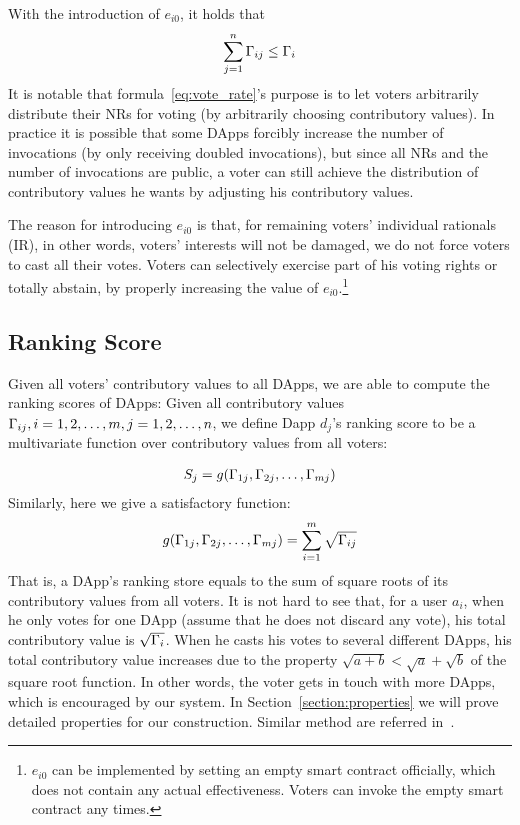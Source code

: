 With the introduction of $e_{i0}$, it holds that
$$\sum_{j=1}^n \Gamma_{ij} \leq \Gamma_i$$
\noindent It is notable that formula~\ref{eq:vote_rate}'s purpose is to let voters arbitrarily distribute their NRs for voting (by arbitrarily choosing contributory values). In practice it is possible that some DApps forcibly increase the number of invocations (by only receiving doubled invocations), but since all NRs and the number of invocations are public, a voter can still achieve the distribution of contributory values he wants by adjusting his contributory values.

The reason for introducing $e_{i0}$ is that, for remaining voters' individual rationals (IR), in other words, voters' interests will not be damaged, we do not force voters to cast all their votes. Voters can selectively exercise part of his voting rights or totally abstain, by properly increasing the value of $e_{i0}$.\footnote{$e_{i0}$ can be implemented by setting an empty smart contract officially, which does not contain any actual effectiveness. Voters can invoke the empty smart contract any times.}
\subsection{Ranking Score}
\noindent Given all voters' contributory values to all DApps, we are able to compute the
ranking scores of DApps: Given all contributory values
$\Gamma_{ij},i=1,2,\ldots,m,j=1,2,\ldots,n$, we define Dapp $d_j$'s ranking score to be a multivariate function over contributory values from all voters:

\begin{align}
	S_j = g(\Gamma_{1j},\Gamma_{2j},\ldots,\Gamma_{mj})
\end{align}
Similarly, here we give a satisfactory function:
\begin{align}
	\label{eq:sqrt}
	g(\Gamma_{1j},\Gamma_{2j},\ldots,\Gamma_{mj}) = \sum_{i=1}^m \sqrt{\Gamma_{ij}}
\end{align}
That is, a DApp's ranking store equals to the sum of square roots of its contributory values from all voters. It is not hard to see that, for a user $a_i$, when he only votes for one DApp (assume that he does not discard any vote), his total contributory value is $\sqrt{\Gamma_i}$. When he casts his votes to several different DApps, his total contributory value increases due to the property $\sqrt{a+b}<\sqrt{a}+\sqrt{b}$ of the square root function. In other words, the voter gets in touch with more DApps, which is encouraged by our system. In Section~\ref{section:properties} we will prove  detailed properties for our construction. Similar method are referred in~\cite{buterin2018liberal}.


